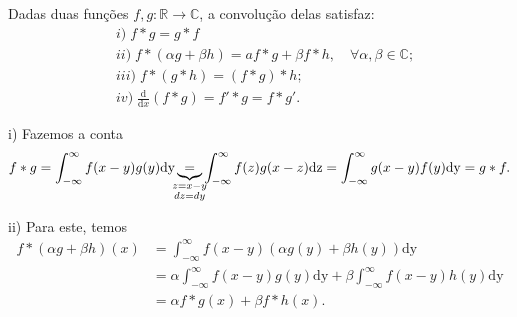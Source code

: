 \documentclass[../pde_notes.tex]{subfiles}
\begin{document}
\begin{prop*}
	Dadas duas funções \(f, g:\mathbb{R}\rightarrow \mathbb{C}\), a convolução delas satisfaz:
	\begin{align*}
		 & i)\;f*g = g*f                                                                               \\
		 & ii)\; f*(\alpha g+\beta h) = af*g + \beta f*h, \quad \forall \alpha , \beta \in \mathbb{C}; \\
		 & iii)\; f*(g*h) = (f*g)*h;                                                                   \\
		 & iv)\; \frac{\mathrm{d}}{\mathrm{d}x}(f*g) = f'*g = f*g'.
	\end{align*}
\end{prop*}
\begin{proof*}
	i) Fazemos a conta
	\[
		f*g = \int_{-\infty}^{\infty}f(x-y)g(y) \mathrm{dy} \underbrace{=}_{\mathclap{\substack{z=x-y \\ dz = dy}}} \int_{-\infty}^{\infty}f(z)g(x-z) \mathrm{dz} = \int_{-\infty}^{\infty}g(x-y)f(y) \mathrm{dy} = g*f.
	\]

	ii) Para este, temos
	\begin{align*}
		f*(\alpha g + \beta h)(x) & = \int_{-\infty}^{\infty}f(x-y)(\alpha g(y) + \beta h(y)) \mathrm{dy}                                        \\
		                          & = \alpha \int_{-\infty}^{\infty}f(x-y)g(y) \mathrm{dy} + \beta \int_{-\infty}^{\infty}f(x-y)h(y) \mathrm{dy} \\
		                          & = \alpha f * g(x) + \beta f*h(x).
	\end{align*}


\end{proof*}
\end{document}

